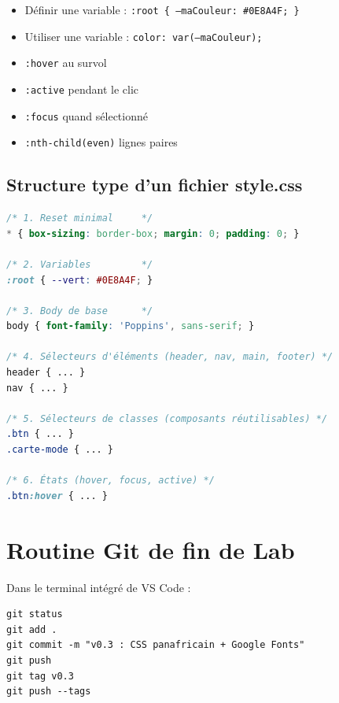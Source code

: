 \documentclass[11pt,a4paper]{article}
\begin{document}
\begin{itemize}[leftmargin=*,nosep]
    \item Définir une variable : \texttt{:root \{ --maCouleur: \#0E8A4F; \}}
    \item Utiliser une variable : \texttt{color: var(--maCouleur);}
    \item \texttt{:hover} \quad au survol
    \item \texttt{:active} \quad pendant le clic
    \item \texttt{:focus} \quad quand sélectionné
    \item \texttt{:nth-child(even)} \quad lignes paires
\end{itemize}

\subsection{Structure type d'un fichier style.css}

\begin{lstlisting}[language=CSS]
/* 1. Reset minimal     */
* { box-sizing: border-box; margin: 0; padding: 0; }

/* 2. Variables         */
:root { --vert: #0E8A4F; }

/* 3. Body de base      */
body { font-family: 'Poppins', sans-serif; }

/* 4. Sélecteurs d'éléments (header, nav, main, footer) */
header { ... }
nav { ... }

/* 5. Sélecteurs de classes (composants réutilisables) */
.btn { ... }
.carte-mode { ... }

/* 6. États (hover, focus, active) */
.btn:hover { ... }
\end{lstlisting}

\newpage

\section{Routine Git de fin de Lab}

Dans le terminal intégré de VS Code :

\begin{lstlisting}
git status
git add .
git commit -m "v0.3 : CSS panafricain + Google Fonts"
git push
git tag v0.3
git push --tags
\end{lstlisting}
\end{document}
